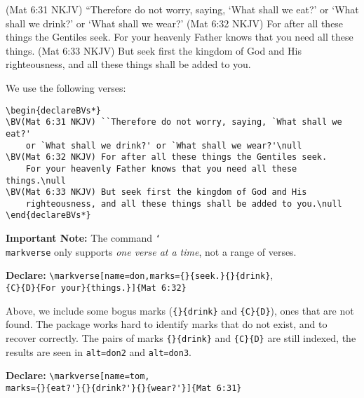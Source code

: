 \documentclass{article}
\def\cs#1{\texttt{\char`\\#1}}
\begin{document}
\begin{declareBVs*}
\BV(Mat 6:31 NKJV) ``Therefore do not worry, saying, `What shall we eat?'
    or `What shall we drink?' or `What shall we wear?'\null
\BV(Mat 6:32 NKJV) For after all these things the Gentiles seek.
    For your heavenly Father knows that you need all these things.\null
\BV(Mat 6:33 NKJV) But seek first the kingdom of God and His righteousness,
    and all these things shall be added to you.\null
\end{declareBVs*}

We use the following verses:
\begin{Verbatim}[fontsize=\small]
\begin{declareBVs*}
\BV(Mat 6:31 NKJV) ``Therefore do not worry, saying, `What shall we eat?'
    or `What shall we drink?' or `What shall we wear?'\null
\BV(Mat 6:32 NKJV) For after all these things the Gentiles seek.
    For your heavenly Father knows that you need all these things.\null
\BV(Mat 6:33 NKJV) But seek first the kingdom of God and His 
    righteousness, and all these things shall be added to you.\null
\end{declareBVs*}
\end{Verbatim}

\removelastskip
\textbf{Important Note:} The command \cs{markverse} only supports \emph{one verse at a time}, not a range of verses.

\textbf{Declare:} \verb!\markverse[name=don,marks={}{seek.}{}{drink}!,\\
\null\qquad\qquad\verb!{C}{D}{For your}{things.}]{Mat 6:32}!

Above, we include some bogus marks (\verb~{}{drink}~ and \verb~{C}{D}~), ones
that are not found. The package works hard to identify marks that do not
exist, and to recover correctly. The pairs of marks \verb~{}{drink}~ and
\verb~{C}{D}~ are still indexed, the results are seen in \texttt{alt=don2}
and \texttt{alt=don3}.






\textbf{Declare:} \verb~\markverse[name=tom,~\\
\null\qquad\qquad\qquad\verb~marks={}{eat?'}{}{drink?'}{}{wear?'}]{Mat 6:31}~
\end{document}
